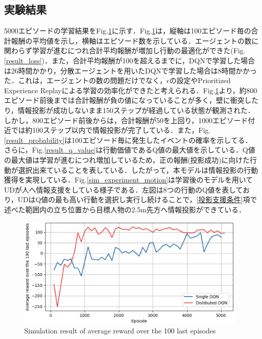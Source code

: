\documentclass[12pt]{sonota/aislab}
\begin{document}
\subsection{実験結果}
5000エピソードの学習結果をFig.\ref{result_reward}に示す．Fig.\ref{result_reward}は，縦軸は100エピソード毎の合計報酬の平均値を示し，横軸はエピソード数を示している．エージェントの数に関わらず学習が進むにつれ合計平均報酬が増加し行動の最適化ができた(Fig.\ref{result_loss})．また，合計平均報酬が100を超えるまでに，DQNで学習した場合は26時間かかり，分散エージェントを用いたDQNで学習した場合は8時間かかった．これは，エージェントの数の問題だけでなく，$\epsilon$の設定やPrioritized Experience Replayによる学習の効率化ができたと考えられる．Fig.\ref{result_reward}より，約800エピソード前後までは合計報酬が負の値になっていることが多く，壁に衝突したり，情報投影が成功しないまま150ステップが経過している状態が観測された．しかし，800エピソード前後からは，合計報酬が50を上回り，1000エピソード付近では約100ステップ以内で情報投影が完了している．また，Fig.\ref{result_probability}は100エピソード毎に発生したイベントの確率を示してる．さらに，Fig.\ref{result_q_value}は行動価値であるQ値の最大値を示している．Q値の最大値は学習が進むにつれ増加しているため，正の報酬(投影成功)に向けた行動が選択出来ていることを表している．したがって，本モデルは情報投影の行動獲得を実現している．Fig.\ref{sim_experiment_motion}は学習後のモデルを用いてUDが人へ情報支援をしている様子である．左図は8つの行動のQ値を表しており，UDはQ値の最も高い行動を選択し実行し続けることで，\ref{投影支援条件}項で述べた範囲内の立ち位置から目標人物の2.5m先方へ情報投影ができている．

\begin{figure}[t]
\begin{center}
\includegraphics[clip, width=11cm]{figs/result_multi_reward.eps}
\caption{Simulation result of average reward over the 100 last episodes}
\label{result_reward}
\end{center}
\end{figure}
\end{document}

